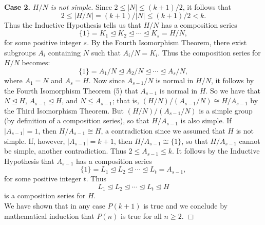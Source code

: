 \documentclass[9pt]{article}
\newcommand{\qed}{\hfill \ensuremath{\Box}}
\begin{document}
\begin{enumerate}
      \textbf{Case 2.} \textit{$H/N$ is not simple.} Since
      $2 \le |N| \le  (k+1)/2$, it follows that
      $$2 \le |H/N| = (k+1)/|N| \le (k+1)/2 < k.$$
      Thus the Inductive Hypothesis tells us that $H/N$ has a composition series
      $$\{1\} = K_1 \trianglelefteq K_2 \trianglelefteq \cdots \trianglelefteq
        K_s = H/N,$$
      for some positive integer $s$. By the Fourth Isomorphism Theorem, there
      exist subgroups $A_i$ containing $N$ such that $A_i/N = K_i$. Thus the
      composition series for $H/N$ becomes:
      $$\{1\} = A_1/N \trianglelefteq A_2/N \trianglelefteq \cdots \trianglelefteq
        A_s/N,$$
      where $A_1 = N$ and $A_s = H$. Now since $A_{s-1}/N$ is normal in $H/N$,
      it follows by the Fourth Isomorphism Theorem (5) that $A_{s-1}$ is normal
      in $H$. So we have that $N \trianglelefteq H$,
      $A_{s-1} \trianglelefteq H$, and $N \le A_{s-1}$; that is,
      $(H/N)/(A_{s-1}/N) \cong H/A_{s-1}$ by the Third Isomorphism Theorem. But
      $(H/N)/(A_{s-1}/N)$ is a simple group (by definition of a composition
      series), so that $H/A_{s-1}$ is also simple. If $|A_{s-1}| = 1$, then
      $H/A_{s-1} \cong H$, a contradiction since we assumed that $H$ is not
      simple. If, however, $|A_{s-1}| = k + 1$, then $H/A_{s-1} \cong \{1\}$,
      so that $H/A_{s-1}$ cannot be simple, another contradiction. Thus
      $2 \le A_{s-1} \le k$. It follows by the Inductive Hypothesis that
      $A_{s-1}$ has a composition series
      $$\{1\} = L_1 \trianglelefteq L_2 \trianglelefteq \cdots \trianglelefteq
        L_t = A_{s-1},$$
      for some positive integer $t$. Thus
      $$L_1 \trianglelefteq L_2 \trianglelefteq \cdots \trianglelefteq
        L_t \trianglelefteq H$$
      is a composition series for $H$. \\
      
      We have shown that in any case $P(k+1)$ is true and we conclude by
      mathematical induction that $P(n)$ is true for all $n \ge 2$. \qed
\end{enumerate}
\end{document}
